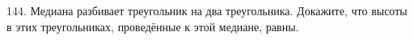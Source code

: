 144. Медиана разбивает треугольник на два треугольника. Докажите, что высоты в этих треугольниках, проведённые к этой медиане, равны.\\
